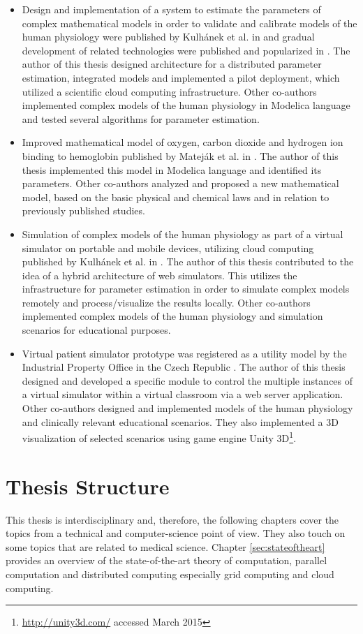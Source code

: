 \begin{itemize}
\item Design and implementation of a system to estimate the parameters of complex mathematical models in order to validate and calibrate models of the human physiology were published by Kulhánek et al. in \cite{Kulhanek2014Parameters} and gradual development of related technologies were published and popularized in \cite{Kulhanek2010, Kulhanek2013c, Kulhanek2011, Kulhanek2014}. The author of this thesis designed architecture for a distributed parameter estimation, integrated models and implemented a pilot deployment, which  utilized a scientific cloud computing infrastructure. Other co-authors implemented complex models of the human physiology in Modelica language and tested several algorithms for parameter estimation.
\item Improved mathematical model of oxygen, carbon dioxide and hydrogen ion binding to hemoglobin published by Mateják et al. in \cite{Matejak2014sj}. The author of this thesis implemented this model in Modelica language and identified its parameters. Other co-authors analyzed and proposed a new mathematical model, based on the basic physical and chemical laws and in relation to previously published studies.
\item Simulation of complex models of the human physiology as part of a virtual simulator on portable and mobile devices, utilizing cloud computing published by Kulhánek et al. in \cite{Kulhanek2013c,Kulhanek2013b}. The author of this thesis contributed to the idea of a hybrid architecture of web simulators. This utilizes the infrastructure for parameter estimation in order to simulate complex models remotely and process/visualize the results locally. Other co-authors implemented complex models of the human physiology and simulation scenarios for educational purposes.
\item Virtual patient simulator prototype was registered as a utility model by the Industrial Property Office in the Czech Republic \cite{Kofranek2014a}. The author of this thesis designed and developed a specific module to control the multiple instances of a virtual simulator within a virtual classroom via a web server application. Other co-authors designed and implemented models of the human physiology and clinically relevant educational scenarios. They also implemented a 3D visualization of selected scenarios using game engine Unity 3D\footnote{\url{http://unity3d.com/} accessed March 2015}.
\end{itemize}

\section{Thesis Structure}
This thesis is interdisciplinary and, therefore, the following chapters cover the topics from a technical and computer-science point of view. They also touch on some topics that are related to medical science.
Chapter \ref{sec:stateoftheart} provides an overview of the state-of-the-art theory of computation, parallel computation and distributed computing especially grid computing and cloud computing. 

